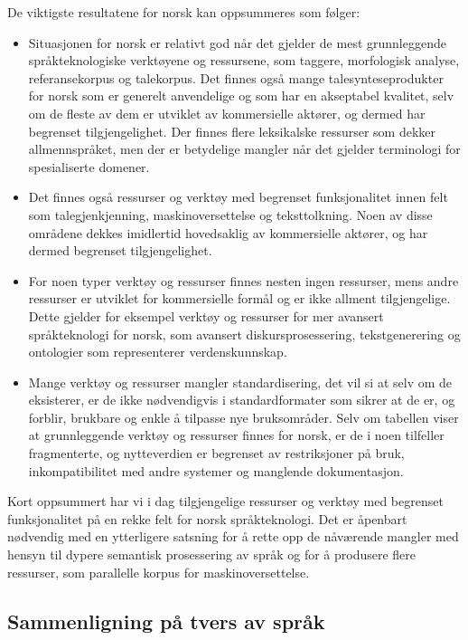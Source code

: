 \begin{multicols}{2}
De viktigste resultatene for norsk kan oppsummeres som følger: 

\begin{itemize}
\item Situasjonen for norsk er relativt god når det gjelder de mest grunnleggende språkteknologiske verktøyene og ressursene, som taggere, morfologisk analyse, referansekorpus og talekorpus.
Det finnes også mange talesynteseprodukter for norsk som er generelt anvendelige og som har en akseptabel kvalitet, selv om de fleste av dem er utviklet av kommersielle aktører, og dermed har begrenset tilgjengelighet. Der finnes flere leksikalske ressurser som dekker allmennspråket, men der er betydelige mangler når det gjelder terminologi for spesialiserte domener.
\item Det finnes også ressurser og verktøy med begrenset funksjonalitet innen felt som talegjenkjenning, maskinoversettelse og teksttolkning. Noen av disse områdene dekkes imidlertid hovedsaklig av kommersielle aktører, og har dermed begrenset tilgjengelighet.
\item For noen typer verktøy og ressurser finnes nesten ingen ressurser, mens andre ressurser er utviklet for kommersielle formål og er ikke allment tilgjengelige. 
Dette gjelder for eksempel verktøy og ressurser for mer avansert språkteknologi for norsk, som avansert diskursprosessering, tekstgenerering og ontologier som representerer verdenskunnskap.
\item Mange verktøy og ressurser mangler standardisering, det vil si at selv om de eksisterer, er de ikke nødvendigvis i standardformater som sikrer at de er, og forblir, brukbare og enkle å tilpasse nye bruksområder.
Selv om tabellen viser at grunnleggende verktøy og ressurser finnes for norsk, er de i noen tilfeller fragmenterte, og nytteverdien er begrenset av restriksjoner på bruk, inkompatibilitet med andre systemer og manglende dokumentasjon. 
\end{itemize}

Kort oppsummert har vi i dag tilgjengelige ressurser og verktøy med begrenset funksjonalitet på en rekke felt for norsk språkteknologi.
Det er åpenbart nødvendig med en ytterligere satsning for å rette opp de nåværende mangler med hensyn til dypere semantisk prosessering av språk og for å produsere flere ressurser, som parallelle korpus for maskinoversettelse.

\subsection{Sammenligning på tvers av språk}


\end{multicols}
